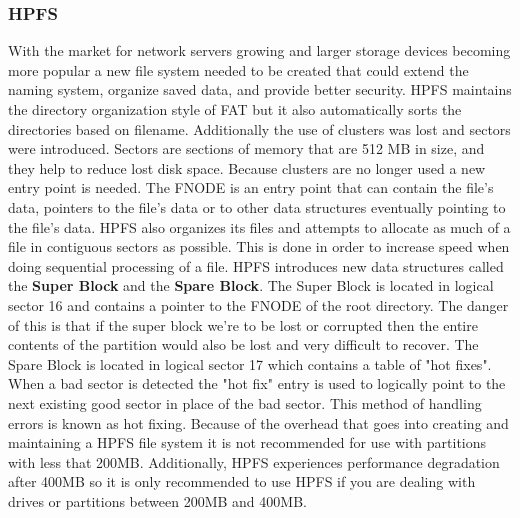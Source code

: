 \documentclass[a4paper,10pt,onecolumn]{article}
\begin{document}
\subsubsection{HPFS}
With the market for network servers growing and larger storage devices becoming more popular a new file system needed to be created that could extend the naming system, organize saved data, and provide better security. HPFS maintains the directory organization style of FAT but it also automatically sorts the directories based on filename. Additionally the use of clusters was lost and sectors were introduced. Sectors are sections of memory that are 512 MB in size, and they help to reduce lost disk space. Because clusters are no longer used a new entry point is needed. The FNODE is an entry point that can contain the file's data, pointers to the file's data or to other data structures eventually pointing to the file's data. 
\newline
\newline
HPFS also organizes its files and attempts to allocate as much of a file in contiguous sectors as possible. This is done in order to increase speed when doing sequential processing of a file.
\newline
\newline
HPFS introduces new data structures called the \textbf{Super Block} and the \textbf{Spare Block}.
\newline
The Super Block is located in logical sector 16 and contains a pointer to the FNODE of the root directory. The danger of this is that if the super block we're to be lost or corrupted then the entire contents of the partition would also be lost and very difficult to recover. 
\newline
The Spare Block is located in logical sector 17 which contains a table of "hot fixes". When a bad sector is detected the "hot fix" entry is used to logically point to the next existing good sector in place of the bad sector. This method of handling errors is known as hot fixing. 
\newline
\newline
Because of the overhead that goes into creating and maintaining a HPFS file system it is not recommended for use with partitions with less that 200MB. Additionally, HPFS experiences performance degradation after 400MB so it is only recommended to use HPFS if you are dealing with drives or partitions between 200MB and 400MB.
\end{document}
